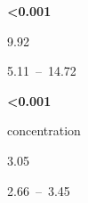 \documentclass[
  letterpaper,
  DIV=11,
  numbers=noendperiod]{scrartcl}
\begin{document}
\begin{table}
\begin{minipage}[t]{\linewidth}
{\centering 

\textbf{\textless0.001}

}

\end{minipage}%
\newline
\begin{minipage}[t]{\linewidth}

{\centering 

9.92

}

\end{minipage}%
\newline
\begin{minipage}[t]{\linewidth}

{\centering 

5.11~--~14.72

}

\end{minipage}%
\newline
\begin{minipage}[t]{\linewidth}

{\centering 

\textbf{\textless0.001}

}

\end{minipage}%
\newline
\begin{minipage}[t]{\linewidth}

{\centering 

concentration

}

\end{minipage}%
\newline
\begin{minipage}[t]{\linewidth}

{\centering 

3.05

}

\end{minipage}%
\newline
\begin{minipage}[t]{\linewidth}

{\centering 

2.66~--~3.45

}

\end{minipage}%
\newline
\begin{minipage}[t]{\linewidth}

{\centering 

}
\end{minipage}
\end{table}
\end{document}
